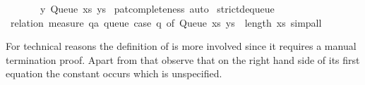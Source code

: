 \begin{isabellebody}
\ \ \ \ \ \ \ {\isacharparenleft}y{\isacharcomma}\ Queue\ xs\ ys{\isacharparenright}{\isachardoublequoteclose}\isanewline
{}\isamarkupfalse%
\ pat{\isacharunderscore}completeness\ auto\isanewline
\isanewline
{}\isamarkupfalse%
\ strict{\isacharunderscore}dequeue{\isacharprime}\isanewline
{}\isamarkupfalse%
\ {\isacharparenleft}relation\ {\isachardoublequoteopen}measure\ {\isacharparenleft}{\isasymlambda}q{\isacharcolon}{\isacharcolon}{\isacharprime}a\ queue{\isachardot}\ case\ q\ of\ Queue\ xs\ ys\ {\isasymRightarrow}\ length\ xs{\isacharparenright}{\isachardoublequoteclose}{\isacharparenright}\ simp{\isacharunderscore}all%
\endisatagquoteme
{\isafoldquoteme}%
%
\isadelimquoteme
%
\endisadelimquoteme
%
\begin{isamarkuptext}%
\noindent For technical reasons the definition of
   is more involved since it requires
  a manual termination proof.  Apart from that observe that
  on the right hand side of its first equation the constant
   occurs which is unspecified.


\end{isamarkuptext}
\end{isabellebody}
